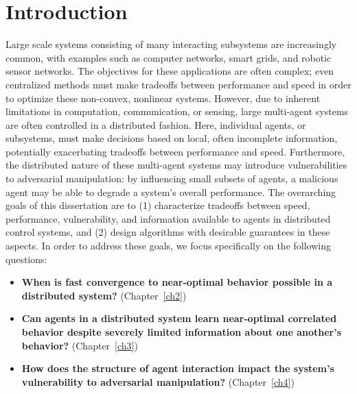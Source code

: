 \chapter{\Large Introduction}
\label{introchap}


Large scale systems consisting of many interacting subsystems are increasingly common, with examples such as computer networks, smart grids, and robotic sensor networks. The objectives for these applications are often complex; even centralized methods must make tradeoffs between performance and speed in order to optimize these non-convex, nonlinear systems. However, due to inherent limitations in computation, communication, or sensing, large multi-agent systems are often controlled in a distributed fashion. Here, individual agents, or subsystems, must make decisions based on local, often incomplete information, potentially exacerbating tradeoffs between performance and speed. Furthermore, the distributed nature of these multi-agent systems may introduce vulnerabilities to adversarial manipulation: by influencing small subsets of agents, a malicious agent may be able to degrade a system's overall performance.
The overarching goals of this dissertation are to (1) characterize tradeoffs between speed, performance, vulnerability, and information available to agents in distributed control systems, and (2) design algorithms with desirable guarantees in these aspects. 
In order to address these goals, we focus specifically on the following questions:



\begin{itemize}[leftmargin=*]
\item \textbf{When is fast convergence to near-optimal behavior possible in a distributed system?} (Chapter~\ref{ch2})
\item\textbf{Can agents in a distributed system learn near-optimal correlated behavior despite severely limited information about one another's behavior?} (Chapter~\ref{ch3})
\item\textbf{How does the structure of agent interaction impact the system's vulnerability to adversarial manipulation?} (Chapter~\ref{ch4})
\end{itemize}

